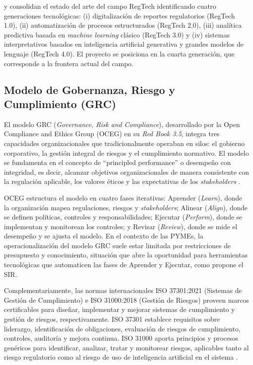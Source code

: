 \documentclass[12pt,a4paper,oneside]{report}
\begin{document}
\textcite{charoenwong2024} y \textcite{liu2022} consolidan el estado del arte del campo RegTech identificando cuatro generaciones tecnológicas: (i) digitalización de reportes regulatorios (RegTech 1.0), (ii) automatización de procesos estructurados (RegTech 2.0), (iii) analítica predictiva basada en \textit{machine learning} clásico (RegTech 3.0) y (iv) sistemas interpretativos basados en inteligencia artificial generativa y grandes modelos de lenguaje (RegTech 4.0). El proyecto se posiciona en la cuarta generación, que corresponde a la frontera actual del campo.

\subsection{Modelo de Gobernanza, Riesgo y Cumplimiento (GRC)}\label{subsec:modelo-grc}

El modelo GRC (\textit{Governance, Risk and Compliance}), desarrollado por la Open Compliance and Ethics Group (OCEG) en su \textit{Red Book 3.5}, integra tres capacidades organizacionales que tradicionalmente operaban en silos: el gobierno corporativo, la gestión integral de riesgos y el cumplimiento normativo. El modelo se fundamenta en el concepto de \enquote{principled performance} o desempeño con integridad, es decir, alcanzar objetivos organizacionales de manera consistente con la regulación aplicable, los valores éticos y las expectativas de los \textit{stakeholders} \parencite{oceg2023}.

OCEG estructura el modelo en cuatro fases iterativas: Aprender (\textit{Learn}), donde la organización mapea regulaciones, riesgos y \textit{stakeholders}; Alinear (\textit{Align}), donde se definen políticas, controles y responsabilidades; Ejecutar (\textit{Perform}), donde se implementan y monitorean los controles; y Revisar (\textit{Review}), donde se mide el desempeño y se ajusta el modelo. En el contexto de las PYMEs, la operacionalización del modelo GRC suele estar limitada por restricciones de presupuesto y conocimiento, situación que abre la oportunidad para herramientas tecnológicas que automaticen las fases de Aprender y Ejecutar, como propone el SIR.

Complementariamente, las normas internacionales ISO 37301:2021 (Sistemas de Gestión de Cumplimiento) e ISO 31000:2018 (Gestión de Riesgos) proveen marcos certificables para diseñar, implementar y mejorar sistemas de cumplimiento y gestión de riesgos, respectivamente. ISO 37301 establece requisitos sobre liderazgo, identificación de obligaciones, evaluación de riesgos de cumplimiento, controles, auditoría y mejora continua. ISO 31000 aporta principios y procesos genéricos para identificar, analizar, tratar y monitorear riesgos, aplicables tanto al riesgo regulatorio como al riesgo de uso de inteligencia artificial en el sistema \parencite{iso37301,iso31000}.
\end{document}
